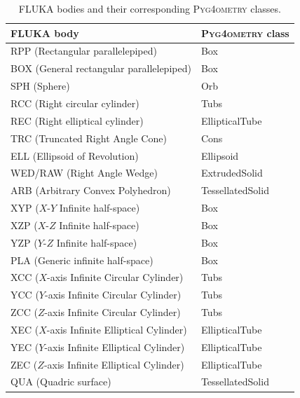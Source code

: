 \documentclass[final,5p,times,twocolumn]{elsarticle}
\newcommand{\PYGEOMETRY}{\textsc{Pyg4ometry}}
\begin{document}
\begin{table}[hbt!]
\caption{FLUKA bodies and their corresponding \PYGEOMETRY{} classes.} \label{tab:Fluka2Geant4}
\centering
\begin{tabular}{ll} \hline
FLUKA body                                              & \PYGEOMETRY{} class \\ \hline
RPP (Rectangular parallelepiped)			& Box \\
BOX (General rectangular parallelepiped)		& Box \\
SPH (Sphere)    					& Orb \\
RCC (Right circular cylinder)				& Tubs \\
REC (Right elliptical cylinder)				& EllipticalTube \\
TRC (Truncated Right Angle Cone)			& Cons \\
ELL (Ellipsoid of Revolution) 				& Ellipsoid \\
WED/RAW (Right Angle Wedge)		        	& ExtrudedSolid \\
ARB	(Arbitrary Convex Polyhedron)			& TessellatedSolid \\
XYP 	($X$-$Y$ Infinite half-space)			& Box \\
XZP 	($X$-$Z$ Infinite half-space)			& Box \\
YZP 	($Y$-$Z$ Infinite half-space)			& Box \\
PLA (Generic infinite half-space)			& Box \\
XCC ($X$-axis Infinite Circular Cylinder)		& Tubs \\
YCC ($Y$-axis Infinite Circular Cylinder)		& Tubs \\
ZCC 	($Z$-axis Infinite Circular Cylinder)		& Tubs \\
XEC 	($X$-axis Infinite Elliptical Cylinder)		& EllipticalTube \\
YEC 	($Y$-axis Infinite Elliptical Cylinder)		& EllipticalTube \\
ZEC ($Z$-axis Infinite Elliptical Cylinder)		& EllipticalTube \\
QUA (Quadric surface) 					& TessellatedSolid \\ \hline
\end{tabular}
\end{table}
\end{document}
